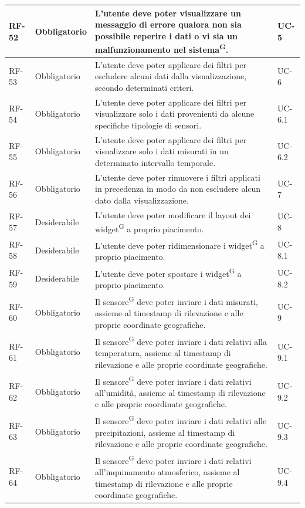 \documentclass[8pt]{article}
\newcommand{\glossterm}[1]{#1\textsuperscript{G}} %
\begin{document}
\begin{longtable}{|>{\centering\arraybackslash}p{1.2cm}|>{\centering\arraybackslash}p{2cm}|>{\centering\arraybackslash}p{8.5cm}|>{\centering\arraybackslash}p{3cm}|}
            RF-52 & Obbligatorio & L'utente deve poter visualizzare un messaggio di errore qualora non sia possibile reperire i dati o vi sia un malfunzionamento nel \glossterm{sistema}. & UC-5 \\ \hline
            RF-53 & Obbligatorio & L'utente deve poter applicare dei filtri per escludere alcuni dati dalla visualizzazione, secondo determinati criteri. & UC-6 \\ \hline
            RF-54 & Obbligatorio & L'utente deve poter applicare dei filtri per visualizzare solo i dati provenienti da alcune specifiche tipologie di sensori. & UC-6.1 \\ \hline
            RF-55 & Obbligatorio & L'utente deve poter applicare dei filtri per visualizzare solo i dati misurati in un determinato intervallo temporale. & UC-6.2 \\ \hline
            RF-56 & Obbligatorio & L'utente deve poter rimuovere i filtri applicati in precedenza in modo da non escludere alcun dato dalla visualizzazione. & UC-7 \\ \hline
            RF-57 & Desiderabile & L'utente deve poter modificare il layout dei \glossterm{widget} a proprio piacimento. & UC-8 \\ \hline
            RF-58 & Desiderabile & L'utente deve poter ridimensionare i \glossterm{widget} a proprio piacimento. & UC-8.1 \\ \hline
            RF-59 & Desiderabile & L'utente deve poter spostare i \glossterm{widget} a proprio piacimento. & UC-8.2 \\ \hline
            RF-60 & Obbligatorio & Il \glossterm{sensore} deve poter inviare i dati misurati, assieme al timestamp di rilevazione e alle proprie coordinate geografiche. & UC-9 \\ \hline
            RF-61 & Obbligatorio & Il \glossterm{sensore} deve poter inviare i dati relativi alla temperatura, assieme al timestamp di rilevazione e alle proprie coordinate geografiche. & UC-9.1 \\ \hline
            RF-62 & Obbligatorio & Il \glossterm{sensore} deve poter inviare i dati relativi all'umidità, assieme al timestamp di rilevazione e alle proprie coordinate geografiche. & UC-9.2 \\ \hline
            RF-63 & Obbligatorio & Il \glossterm{sensore} deve poter inviare i dati relativi alle precipitazioni, assieme al timestamp di rilevazione e alle proprie coordinate geografiche. & UC-9.3 \\ \hline
            RF-64 & Obbligatorio & Il \glossterm{sensore} deve poter inviare i dati relativi all'inquinamento atmosferico, assieme al timestamp di rilevazione e alle proprie coordinate geografiche. & UC-9.4 \\ \hline

\end{longtable}
\end{document}
